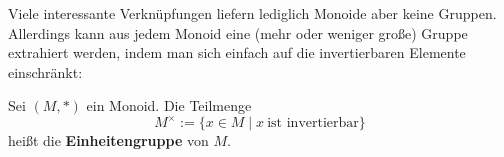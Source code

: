 \begin{comment}
		\end{tikzpicture}
	\centering \caption{Symmetrien eines Quadrates}
	\end{figure}
	
	Auf der Menge $S=\{\iden,r_1,r_2,r_3,f_1,f_2,f_3,f_4\}$ betrachten wir die Hintereinanderausführung von Abbildungen $\circ$ als Verknüpfung; etwa gilt $f_1\circ f_2=r_2$, wie man sich mittels eines Bildchens schnell verdeutlicht. Die Verkettung zweier Symmetrien ergibt wieder eine Symmetrie, also ist $\circ$ tatsächlich eine Verknüpfung auf $S$. [Tabelle?]
	
	Wir möchten nun zeigen, dass $(S,\circ,\iden)$ eine Gruppe bildet, und prüfen dazu die geforderten Eigenschaften.
	Dass $\circ$ assoziativ ist, gilt ganz allgemein für Abbildungen [Referenz?].
	Die Identität $\iden$ ist neutrales Element bezüglich $\circ$, siehe [Referenz].
	Jetzt müssen wir noch zu jedem Element Inverse finden. Die Identität hat als Inverses sich selbst, denn es gilt
		\[ \iden\circ\iden=\iden \,.\]
	Die Rotation um $x$ Grad hat als Inverses die Rotation um $360-x$ Grad (denn Hintereinanderausführung ergibt dann die Rotation um 360 Grad, die der Identität entspricht). Konkret:
		\begin{align*}
			r_1\circ r_3 &= \iden = r_3\circ r_1 \,, \\
			r_2\circ r_2 &= \iden \,.
		\end{align*}
	Führt man dieselbe Achsenspiegelung zwei mal hintereinander aus, landen man wieder, wo man gestartet ist, also sind die vier Achsenspiegelungen alle selbstinvers:
		\[ \iden=f_1\circ f_1=f_2\circ f_2=f_3\circ f_3 = f_4\circ f_4\,. \]
		
	Damit ist bewiesen, dass $(S,\circ,\iden)$ eine Gruppe ist.
\end{bsp}
\end{comment}



Viele interessante Verknüpfungen liefern lediglich Monoide aber keine Gruppen. Allerdings kann aus jedem Monoid eine (mehr oder weniger große) Gruppe extrahiert werden, indem man sich einfach auf die invertierbaren Elemente einschränkt:


\begin{de}
Sei $(M,*)$ ein Monoid. Die Teilmenge
\[ M^\times := \{x\in M\mid x\ \text{ist invertierbar} \} \]
heißt die \textbf{Einheitengruppe} von $M$.
\end{de}


